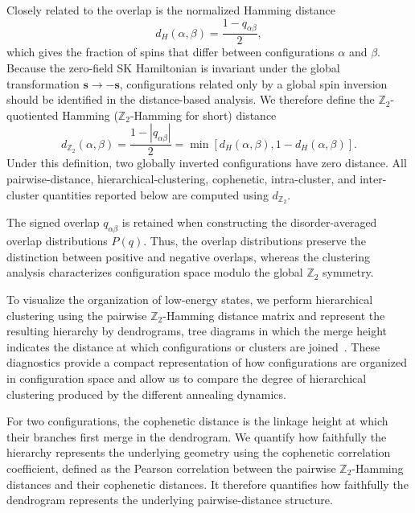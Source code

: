 \documentclass[
reprint,
amsmath,amssymb,
aps,
pre,
floatfix,
]{revtex4-2}
\begin{document}
Closely related to the overlap is the normalized Hamming distance
\begin{equation}
d_H(\alpha,\beta)
=
\frac{1-q_{\alpha\beta}}{2},
\end{equation}
which gives the fraction of spins that differ between configurations
$\alpha$ and $\beta$. Because the zero-field SK Hamiltonian is invariant under
the global transformation $\mathbf{s}\rightarrow-\mathbf{s}$, configurations
related only by a global spin inversion should be identified in the
distance-based analysis. We therefore define the
$\mathbb{Z}_2$-quotiented Hamming ($\mathbb{Z}_2$-Hamming for short) distance
\begin{equation}
d_{\mathbb Z_2}(\alpha,\beta)
=
\frac{1-|q_{\alpha\beta}|}{2}
=
\min\!\left[
d_H(\alpha,\beta),
1-d_H(\alpha,\beta)
\right].
\end{equation}
Under this definition, two globally inverted configurations have zero
distance. All pairwise-distance, hierarchical-clustering, cophenetic,
intra-cluster, and inter-cluster quantities reported below are computed
using $d_{\mathbb Z_2}$.

The signed overlap $q_{\alpha\beta}$ is retained when constructing the
disorder-averaged overlap distributions $P(q)$. Thus, the overlap
distributions preserve the distinction between positive and negative
overlaps, whereas the clustering analysis characterizes configuration
space modulo the global $\mathbb Z_2$ symmetry.

To visualize the organization of low-energy states, we perform hierarchical clustering using the pairwise $\mathbb{Z}_2$-Hamming distance matrix and represent the resulting hierarchy by dendrograms, tree diagrams in which the merge height indicates the distance at which configurations or clusters are joined~\cite{Zhang2025Complexity}. These diagnostics provide a compact representation of how configurations are organized in configuration space and allow us to compare the degree of hierarchical clustering produced by the different annealing dynamics.



For two configurations, the cophenetic distance is the linkage height at
which their branches first merge in the dendrogram. We quantify how faithfully
the hierarchy represents the underlying geometry using the cophenetic
correlation coefficient, defined as the Pearson correlation between the
pairwise $\mathbb{Z}_2$-Hamming distances and their cophenetic distances. It therefore quantifies how faithfully the dendrogram represents the underlying pairwise-distance structure.
\end{document}
